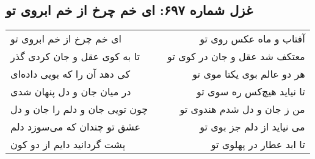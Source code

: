 \begin{center}
\section*{غزل شماره ۶۹۷: ای خم چرخ از خم ابروی تو}
\label{sec:697}
\begin{longtable}{l p{0.5cm} r}
ای خم چرخ از خم ابروی تو
&&
آفتاب و ماه عکس روی تو
\\
تا به کوی عقل و جان کردی گذر
&&
معتکف شد عقل و جان در کوی تو
\\
کی دهد آن را که بویی داده‌ای
&&
هر دو عالم بوی یکتا موی تو
\\
در میان جان و دل پنهان شدی
&&
تا نیاید هیچ‌کس ره سوی تو
\\
چون تویی جان و دلم را جان و دل
&&
من ز جان و دل شدم هندوی تو
\\
عشق تو چندان که می‌سوزد دلم
&&
می نیاید از دلم جز بوی تو
\\
پشت گردانید دایم از دو کون
&&
تا ابد عطار در پهلوی تو
\\
\end{longtable}
\end{center}
